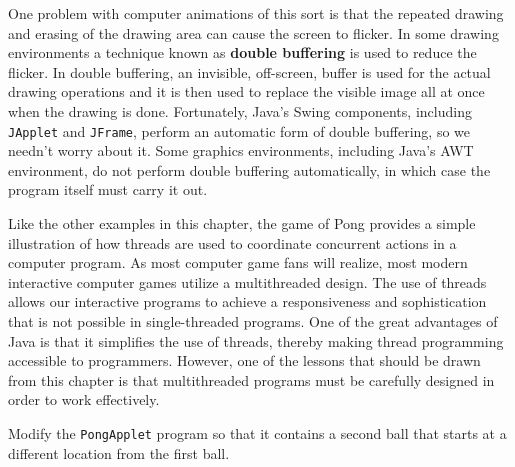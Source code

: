 One problem with computer animations of this sort is that the repeated
drawing and erasing of the drawing area can cause the screen to
flicker. In some drawing environments a technique known as {\bf double
buffering} is used to reduce the flicker. In double buffering, an
invisible, off-screen, buffer is used for the actual drawing
operations and it is then used to replace the visible image all at
once when the drawing is done.  Fortunately, Java's Swing components,
including {\tt JApplet} and {\tt JFrame}, perform an automatic form of
double buffering, so we needn't worry about it.  Some graphics
environments, including Java's AWT environment, do not perform double
buffering automatically, in which case the program itself must carry
it out.

Like the other examples in this chapter, the game of Pong provides a
simple illustration of how threads are used to coordinate concurrent
actions in a computer program. As most computer game fans will
realize, most modern interactive computer games utilize a
multithreaded design. The use of threads allows our interactive
programs to achieve a responsiveness and sophistication that is not
possible in single-threaded programs.  One of the great advantages of
Java is that it simplifies the use of threads, thereby making thread
programming accessible to programmers.  However, one of the lessons
that should be drawn from this chapter is that multithreaded programs
must be carefully designed in order to work effectively.

\begin{SSTUDY}

\item Modify the {\tt PongApplet} program so that it contains a second
ball that starts at a different location from the first ball.

\end{SSTUDY}





